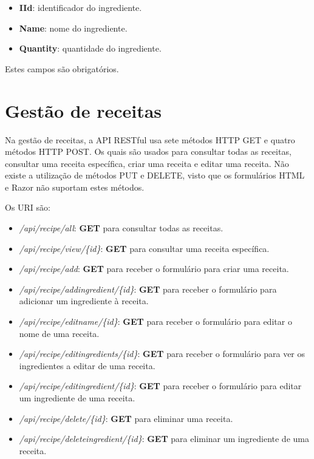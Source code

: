 \begin{itemize}
  \item \textbf{IId}: identificador do ingrediente.
  \item \textbf{Name}: nome do ingrediente.
  \item \textbf{Quantity}: quantidade do ingrediente.
\end{itemize}

Estes campos são obrigatórios.

\section{Gestão de receitas}

Na gestão de receitas, a API RESTful usa sete métodos HTTP GET e quatro métodos HTTP POST. Os quais são usados para consultar todas as receitas, consultar uma receita específica, criar uma receita e editar uma receita. Não existe a utilização de métodos PUT e DELETE, visto que os formulários HTML e Razor não suportam estes métodos.

Os URI são:

\begin{itemize}
  \item \textit{/api/recipe/all}: \textbf{GET} para consultar todas as receitas.
  \item \textit{/api/recipe/view/\{id\}}: \textbf{GET} para consultar uma
  receita específica.
  \item \textit{/api/recipe/add}: \textbf{GET} para receber o formulário para
  criar uma receita.
  \item \textit{/api/recipe/addingredient/\{id\}}: \textbf{GET} para receber o
  formulário para adicionar um ingrediente à receita.
  \item \textit{/api/recipe/editname/\{id\}}: \textbf{GET} para receber o
  formulário para editar o nome de uma receita.
  \item \textit{/api/recipe/editingredients/\{id\}}: \textbf{GET} para receber o
  formulário para ver os ingredientes a editar de uma receita.
  \item \textit{/api/recipe/editingredient/\{id\}}: \textbf{GET} para receber o
  formulário para editar um ingrediente de uma receita.
  \item \textit{/api/recipe/delete/\{id\}}: \textbf{GET} para eliminar uma
  receita.
  \item \textit{/api/recipe/deleteingredient/\{id\}}: \textbf{GET} para eliminar
  um ingrediente de uma receita.
\end{itemize}

